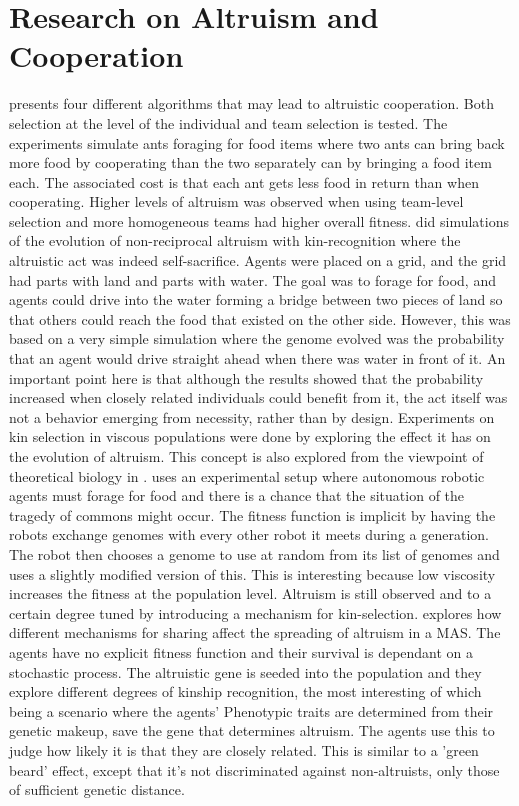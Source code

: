 \documentclass[a4paper]{book}
\begin{document}
\section{Research on Altruism and Cooperation}
\label{sec:cs}

\cite{floreano_evolution_2008} presents four different algorithms that may lead to altruistic cooperation. Both selection at the level of the individual and team selection is tested. The experiments simulate ants foraging for food items where two ants can bring back more food by cooperating than the two separately can by bringing a food item each. The associated cost is that each ant gets less food in return than when cooperating. Higher levels of altruism was observed when using team-level selection and more homogeneous teams had higher overall fitness. 
\cite{martijn_brinkers_evolution_1999} did simulations of the evolution of non-reciprocal altruism with kin-recognition where the altruistic act was indeed self-sacrifice. Agents were placed on a grid, and the grid had parts with land and parts with water. The goal was to forage for food, and agents could drive into the water forming a bridge between two pieces of land so that others could reach the food that existed on the other side. However, this was based on a very simple simulation where the genome evolved was the probability that an agent would drive straight ahead when there was water in front of it. An important point here is that although the results showed that the probability increased when closely related individuals could benefit from it, the act itself was not a behavior emerging from necessity, rather than by design. 
Experiments on kin selection in viscous populations were done by \cite{dulk_evolution_2000} exploring the effect it has on the evolution of altruism. This concept is also explored from the viewpoint of theoretical biology in \cite{joshua_mitteldorf_population_2000}. 
\cite{montanier_surviving_2011} uses an experimental setup where autonomous robotic agents must forage for food and there is a chance that the situation of the tragedy of commons might occur. The fitness function is implicit by having the robots exchange genomes with every other robot it meets during a generation. The robot then chooses a genome to use at random from its list of genomes and uses a slightly modified version of this. This is interesting because low viscosity increases the fitness at the population level. Altruism is still observed and to a certain degree tuned by introducing a mechanism for kin-selection. 
\cite{turner_stochastic_2003} explores how different mechanisms for sharing affect the spreading of altruism in a MAS. The agents have no explicit fitness function and their survival is dependant on a stochastic process. The altruistic gene is seeded into the population and they explore different degrees of kinship recognition, the most interesting of which being a scenario where the agents' Phenotypic traits are determined from their genetic makeup, save the gene that determines altruism. The agents use this to judge how likely it is that they are closely related. This is similar to a 'green beard' effect, except that it's not discriminated against non-altruists, only those of sufficient genetic distance.
\end{document}
